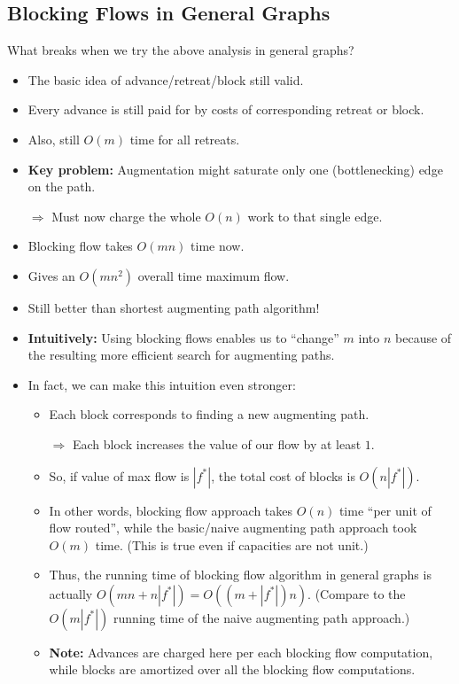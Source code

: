 \documentclass{article}
\begin{document}
\begin{itemize}

\end{itemize}

\subsection{Blocking Flows in General Graphs}

What breaks when we try the above analysis in general graphs?

\begin{itemize}
\item The basic idea of advance/retreat/block still valid.
\item Every advance is still paid for by costs of corresponding retreat or block.
\item Also, still $O(m)$ time for all retreats.
\item \textbf{Key problem:} Augmentation might saturate only one (bottlenecking) edge on the path. 

$\Rightarrow$ Must now charge the whole $O(n)$ work to that single edge. 
\item Blocking flow takes $O(mn)$ time now. 
\item Gives an $O(mn^2)$ overall time maximum flow. 
\item Still better than shortest augmenting path algorithm!
\item \textbf{Intuitively:} Using blocking flows enables us to ``change'' $m$ into $n$ because of the resulting more efficient search for augmenting paths. 
\item In fact, we can make this intuition even stronger:
\begin{itemize}
\item Each block corresponds to finding a new augmenting path.

$\Rightarrow$ Each block increases the value of our flow by at least $1$. 
\item So, if value of max flow is $|f^*|$, the total cost of blocks is $O(n|f^*|)$.
\item In other words, blocking flow approach takes $O(n)$ time ``per unit of flow routed'', while the basic/naive augmenting path approach  took $O(m)$ time. (This is true even if capacities are not unit.)
\item Thus, the running time of blocking flow algorithm in general graphs is actually $O(mn+n|f^*|)=O((m+|f^*|)n)$. (Compare to the $O(m|f^*|)$ running time of the naive augmenting path approach.)

\item \textbf{Note:} Advances are charged here per each blocking flow computation, while blocks are amortized over all the blocking flow computations.
\end{itemize}
\end{itemize}
\end{document}
